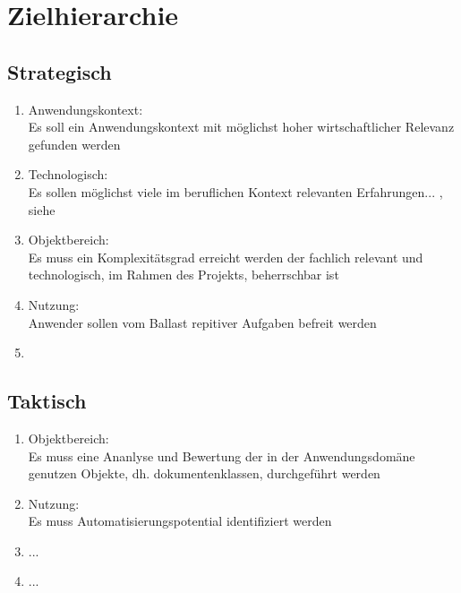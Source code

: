 \chapter{Zielhierarchie}
\label{cha:zielhierarchie}

\begin{comment}
Eine Zielhierarchie lässt sich in drei Ebenen strukturieren.
+ strategische Ziele sind Ziele, die auf langfristige Sicht erreicht werden sollen. 
	Strategische Ziele beantworten die Frage "Was soll erreicht werden?"
+ taktische Ziele sind Ziele, die auf mittelfristige Sicht erreicht werden sollen.
	Taktische Ziele beantworten die Frage "Wie soll es erreicht werden?"
+ operative Ziele sind Ziele, die auf kurzfristige Sicht erreicht werden sollen.
	Operative Ziele beantworten die Frage "durch welche Aktivitäten soll es erreicht werden?" 
Die Zielpriorisierung sollte sich durch die verwendeten Verben (muss,soll,kann) ausdrücken. 
\end{comment}


\section{Strategisch}
\label{sec:zielhierarchie-strategisch}

\begin{enumerate}
\item Anwendungskontext:\\
Es soll ein Anwendungskontext mit möglichst hoher wirtschaftlicher Relevanz gefunden werden
\item Technologisch:\\
Es sollen möglichst viele im beruflichen Kontext relevanten Erfahrungen... , siehe \nameref{}
\item Objektbereich:\\
Es muss ein Komplexitätsgrad erreicht werden der fachlich relevant und technologisch, im Rahmen des Projekts, beherrschbar ist
\item Nutzung:\\
Anwender sollen vom Ballast repitiver Aufgaben befreit werden
\item 
\end{enumerate}


%
\section{Taktisch}
\label{sec:zielhierarchie-taktisch}

\begin{enumerate}
\item Objektbereich:\\
Es muss eine Ananlyse und Bewertung der in der Anwendungsdomäne genutzen Objekte, dh. dokumentenklassen, durchgeführt werden
\item Nutzung:\\
Es muss Automatisierungspotential identifiziert werden
\item ...
\item ...
\end{enumerate}


